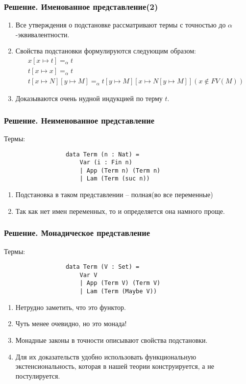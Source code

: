 \documentclass{beamer}
\newcommand{\alphaeq}{=_{\alpha}}
\begin{document}
\begin{frame}[fragile=singleslide]\frametitle{Решение. Именованное представление(2)}
    \begin{enumerate}
        \item Все утверждения о подстановке рассматривают термы с точностью до $\alpha$-эквивалентности.
        \item Свойства подстановки формулируются следующим образом:
            \begin{align*}
                &x[x \mapsto t] \alphaeq t\\
                &t[x \mapsto x] \alphaeq t\\
                &t[x \mapsto N][y \mapsto M] \alphaeq t[y \mapsto M][x \mapsto N[y \mapsto M]] (x \notin FV(M))
            \end{align*}
        \item Доказываются очень нудной индукцией по терму $t$.
    \end{enumerate}
\end{frame}


\begin{frame}[fragile=singleslide]\frametitle{Решение. Неименованное представление}
    Термы:
    \begin{figure}[H]
            \center
            \begin{verbatim}
            data Term (n : Nat) =
                Var (i : Fin n) 
                | App (Term n) (Term n)
                | Lam (Term (suc n))
            \end{verbatim}
        \end{figure}
    \begin{enumerate}
        \item Подстановка в таком представлении -- полная(во все переменные)
        \item Так как нет имен переменных, то и определяется она намного проще.
    \end{enumerate}
\end{frame}


\begin{frame}[fragile=singleslide]\frametitle{Решение. Монадическое представление}
    Термы:
    \begin{figure}[H]
            \center
            \begin{verbatim}
            data Term (V : Set) =
                Var V 
                | App (Term V) (Term V)
                | Lam (Term (Maybe V))
            \end{verbatim}
        \end{figure}
    \begin{enumerate}
        \item Нетрудно заметить, что это функтор.
        \item Чуть менее очевидно, но это монада!
        \item Монадные законы в точности описывают свойства подстановки.
        \item Для их доказательств удобно использовать функциональную экстенсиональность, которая в нашей теории конструируется, а не постулируется.
    \end{enumerate}
\end{frame}
\end{document}
